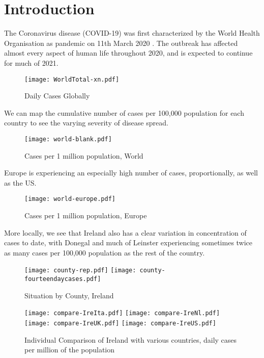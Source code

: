 \section{Introduction}
\label{ch:intro}

The Coronavirus disease (COVID-19) was first characterized by the World Health Organisation as pandemic on 11th March 2020 \cite{whodeclare20}. The outbreak has affected almost every aspect of human life throughout 2020, and is expected to continue for much of 2021. 

\begin{figure}[H]
\texttt{[image: WorldTotal-xn.pdf]}
\caption{Daily Cases Globally}
\end{figure}

We can map the cumulative number of cases per 100,000 population for each country to see the varying severity of disease spread. 

\begin{figure}[H]
\texttt{[image: world-blank.pdf]}
\caption{Cases per 1 million population, World}
\end{figure}

Europe is experiencing an especially high number of cases, proportionally, as well as the US.

\begin{figure}[H]
\texttt{[image: world-europe.pdf]}
\caption{Cases per 1 million population,  Europe}
\end{figure}

More locally, we see that Ireland also has a clear variation in concentration of cases to date, with Donegal and much of Leinster experiencing sometimes twice as many cases per 100,000 population as the rest of the country.

\begin{figure}[H]
\texttt{[image: county-rep.pdf]}
\endminipage\hfill
{}
\texttt{[image: county-fourteendaycases.pdf]}
\endminipage
\caption{Situation by County, Ireland}
\end{figure}

\begin{figure}[H]
\texttt{[image: compare-IreIta.pdf]}
\endminipage\hfill
{}
\texttt{[image: compare-IreNl.pdf]}
\endminipage \\
\texttt{[image: compare-IreUK.pdf]}
\endminipage\hfill
{}
\texttt{[image: compare-IreUS.pdf]}
\endminipage
\caption{Individual Comparison of Ireland with various countries, daily cases per million of the population}
\end{figure}

